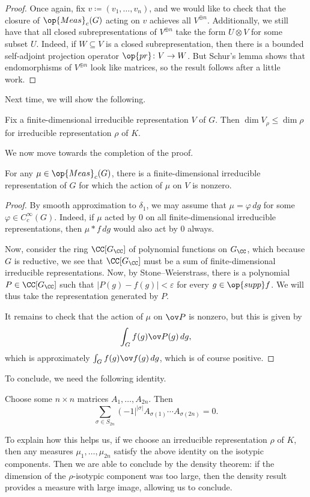 \documentclass[../notes.tex]{subfiles}
\begin{document}
\begin{proof}
	Once again, fix $v\coloneqq(v_1,\ldots,v_n)$, and we would like to check that the closure of $\op{Meas}_c(G)$ acting on $v$ achieves all $V^{\oplus n}$. Additionally, we still have that all closed subrepresentations of $V^{\oplus n}$ take the form $U\otimes V$ for some subset $U$. Indeed, if $W\subseteq V$ is a closed subrepresentation, then there is a bounded self-adjoint projection operator $\op{pr}\colon V\to W$. But Schur's lemma shows that endomorphisms of $V^{\oplus n}$ look like matrices, so the result follows after a little work.
\end{proof}
Next time, we will show the following.
\begin{proposition}
	Fix a finite-dimensional irreducible representation $V$ of $G$. Then $\dim V_\rho\le\dim\rho$ for irreducible representation $\rho$ of $K$.
\end{proposition}
We now move towards the completion of the proof.
\begin{lemma}
	For any $\mu\in\op{Meas}_c(G)$, there is a finite-dimensional irreducible representation of $G$ for which the action of $\mu$ on $V$ is nonzero.
\end{lemma}
\begin{proof}
	By smooth approximation to $\delta_1$, we may assume that $\mu=\varphi\,dg$ for some $\varphi\in C_c^\infty(G)$. Indeed, if $\mu$ acted by $0$ on all finite-dimensional irreducible representations, then $\mu*f\,dg$ would also act by $0$ always.\todo{}

	Now, consider the ring $\CC[G_\CC]$ of polynomial functions on $G_\CC$, which because $G$ is reductive, we see that $\CC[G_\CC]$ must be a sum of finite-dimensional irreducible representations. Now, by Stone--Weierstrass, there is a polynomial $P\in\CC[G_\CC]$ such that $\left|P(g)-f(g)\right|<\varepsilon$ for every $g\in\op{supp}f$. We will thus take the representation generated by $P$.

	It remains to check that the action of $\mu$ on $\ov P$ is nonzero, but this is given by
	\[\int_G f(g)\ov P(g)\,dg,\]
	which is approximately $\int_Gf(g)\ov f(g)\,dg$, which is of course positive.
\end{proof}
To conclude, we need the following identity.
\begin{theorem}
	Choose some $n\times n$ matrices $A_1,\ldots,A_{2n}$. Then
	\[\sum_{\sigma\in S_{2n}}\left(-1\right|^{\left|\sigma\right|}A_{\sigma(1)}\cdots A_{\sigma(2n)}=0.\]
\end{theorem}
To explain how this helps us, if we choose an irreducible representation $\rho$ of $K$, then any measures $\mu_1,\ldots,\mu_{2n}$ satisfy the above identity on the isotypic components. Then we are able to conclude by the density theorem: if the dimension of the $\rho$-isotypic component was too large, then the density result provides a measure with large image, allowing us to conclude.
\end{document}
